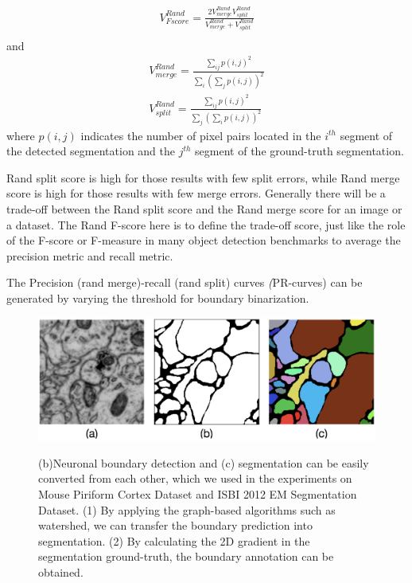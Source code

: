\documentclass[senior]{IPSstyle}
\begin{document}
\begin{eqnarray}
V_{Fscore}^{Rand} = \frac{2 V_{merge}^{Rand} V_{split}^{Rand}}{V_{merge}^{Rand} + V_{split}^{Rand}}\\
\end{eqnarray}
and 
\begin{eqnarray}
V_{merge}^{Rand} = \frac{\sum_{ij} p(i, j)^2}{\sum_i(\sum_j p(i, j))^2} \\
V_{split}^{Rand} = \frac{\sum_{ij} p(i, j)^2}{\sum_j(\sum_i p(i, j))^2}
\end{eqnarray}
where \(p(i, j)\) indicates the number of pixel pairs located in the \(i^{th}\) segment of the detected segmentation and the \(j^{th}\) segment of the ground-truth segmentation.

Rand split score is high for those results with few split errors, while Rand merge score is high for those results with few merge errors. Generally there will be a trade-off between the Rand split score and the Rand merge score for an image or a dataset. The Rand F-score here is to define the trade-off score, just like the role of the F-score or F-measure in many object detection benchmarks to average the precision metric and recall metric.

The Precision (rand merge)-recall (rand split) curves \emph(PR-curves) can be generated by varying the threshold for boundary binarization\cite{Shen2016CVPR}.

\begin{figure}[t]
  \centering
  \includegraphics[width=15cm]{segmentation_and_boundary.png}\\
  \caption{(b)Neuronal boundary detection and (c) segmentation can be easily converted from each other, which we used in the experiments on Mouse Piriform Cortex Dataset\cite{Lee2015} and ISBI 2012 EM Segmentation Dataset\cite{Ronneberger2015}. (1) By applying the graph-based algorithms such as watershed, we can transfer the boundary prediction into segmentation. (2) By calculating the 2D gradient in the segmentation ground-truth, the boundary annotation can be obtained. }\label{segmentation and boundary}
\end{figure}
\end{document}
